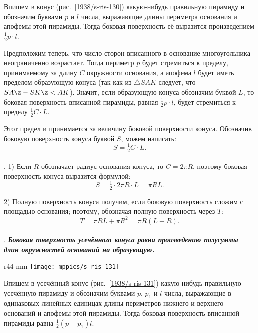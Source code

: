 Впишем в конус (рис.~\ref{1938/s-ris-130}) какую-нибудь правильную пирамиду и обозначим буквами $p$ и $l$ числа, выражающие длины периметра основания и апофемы этой пирамиды.
Тогда боковая поверхность её выразится произведением $\tfrac12 p\cdot l$.

Предположим теперь, что число сторон вписанного в основание многоугольника неограниченно возрастает.
Тогда периметр $p$ будет стремиться к пределу, принимаемому за длину $C$ окружности основания, а апофема $l$ будет иметь пределом образующую конуса (так как из $\triangle SAK$ следует, что $SA\z-SK\z<AK$).
Значит, если образующую конуса обозначим буквой $L$, то боковая поверхность вписанной пирамиды, равная $\tfrac12 p\cdot l$, будет стремиться к пределу $\tfrac12 C\cdot L$. 

Этот предел и принимается за величину боковой поверхности конуса.
Обозначив боковую поверхность конуса буквой $S$, можем написать:
\[S = \tfrac12 C\cdot L.\]

\paragraph{}\label{1938/s115}
. 1) Если $R$ обозначает радиус основания конуса, то $C= 2\pi R$, поэтому боковая поверхность конуса выразится формулой:
\[S
= \tfrac12 \cdot 2\pi R \cdot L
=\pi RL.\]

2) Полную поверхность конуса получим, если боковую поверхность сложим с площадью основания;
поэтому, обозначая полную поверхность через $T$:
\[T= \pi RL + \pi R^2 = \pi R(L + R).\]

\paragraph{}\label{1938/s116}
.
\textbf{\emph{Боковая поверхность усечённого конуса равна произведению полусуммы длин окружностей оснований на образующую.}}

\begin{wrapfigure}{r}{44 mm}
\vskip-0mm
\centering
\texttt{[image: mppics/s-ris-131]}
\caption{}\label{1938/s-ris-131}
\vskip-0mm
\end{wrapfigure}

Впишем в усечённый конус (рис.~\ref{1938/s-ris-131}) какую-нибудь правильную усечённую пирамиду и обозначим буквами $p$, $p_1$ и $l$ числа, выражающие в одинаковых линейных единицах длины периметров нижнего и верхнего оснований и апофемы этой пирамиды.
Тогда боковая поверхность вписанной пирамиды равна $\tfrac12 (p+p_1)l$.

